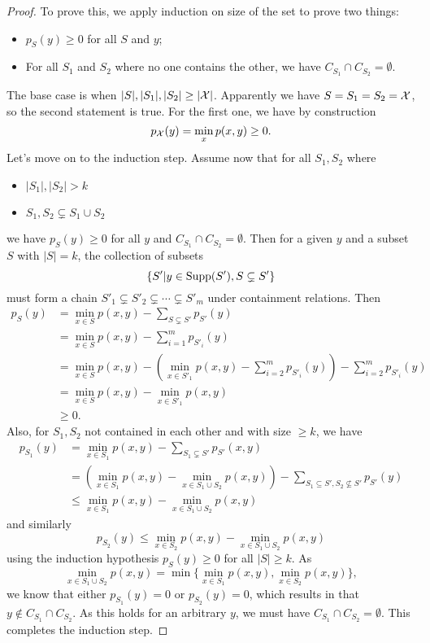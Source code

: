 \begin{proof}
    To prove this, we apply induction on size of the set to prove two things: 
    \begin{itemize}
    \item $p_S(y)\geq 0$ for all $S$ and $y$;
    \item For all $S_1$ and $S_2$ where no one contains the other, we have $C_{S_1}\cap C_{S_2}=\emptyset$.
    \end{itemize}
    The base case is when $|S|,|S_1|,|S_2|\geq|\mathcal{X}|$. Apparently we have $S=S_1=S_2=\mathcal{X}$, so the second statement is true. For the first one, we have by construction
    $$p_{\mathcal{X}}(y)=\min_xp(x,y)\geq0.$$
    Let's move on to the induction step. Assume now that for all $S_1,S_2$ where\begin{itemize}\item $|S_1|,|S_2|> k$\item $S_1,S_2\subsetneq S_1\cup S_2$\end{itemize}
    we have $p_S(y)\geq 0$ for all $y$ and $C_{S_1}\cap C_{S_2}=\emptyset$. Then for a given $y$ and a subset $S$ with $|S|=k$, the collection of subsets
    $$\{S'|y\in \mathrm{Supp}(S'),S\subsetneq S'\}$$
    must form a chain $S'_1\subsetneq S'_2\subsetneq \cdots\subsetneq S'_m$ under containment relations. Then
    \begin{align*}
        p_S(y)&=\min_{x\in S}p(x,y)-\sum_{S\subsetneq S'}p_{S'}(y)\\
        &=\min_{x\in S}p(x,y)-\sum_{i=1}^m p_{S'_i}(y)\\
        &=\min_{x\in S}p(x,y)-\left(\min_{x\in S'_1}p(x,y)-\sum_{i=2}^m p_{S'_i}(y)\right)-\sum_{i=2}^m p_{S'_i}(y)\\
        &=\min_{x\in S}p(x,y)-\min_{x\in S'_1}p(x,y)\\
        &\geq0.
    \end{align*}
    Also, for $S_1,S_2$ not contained in each other and with size $\geq k$, we have
    \begin{align*}
        p_{S_1}(y)&=\min_{x\in S_1}p(x,y)-\sum_{S_1\subsetneq S'}p_{S'}(x,y)\\
        &=\left(\min_{x\in S_1}p(x,y)-\min_{x\in S_1\cup S_2}p(x,y)\right)-\sum_{S_1\subseteq S', S_2\not\subseteq S'}p_{S'}(y)\\
        &\leq \min_{x\in S_1}p(x,y)-\min_{x\in S_1\cup S_2}p(x,y)\end{align*}
     and similarly 
     $$p_{S_2}(y)\leq\min_{x\in S_2}p(x,y)-\min_{x\in S_1\cup S_2}p(x,y)$$
     using the induction hypothesis $p_S(y)\geq0$ for all $|S|\geq k$.
    As $$\min_{x\in S_1\cup S_2}p(x,y)=\min\{\min_{x\in S_1}p(x,y),\min_{x\in S_2}p(x,y)\},$$ we know that either $p_{S_1}(y)= 0$ or $p_{S_2}(y)= 0$, which results in that $y\notin C_{S_1}\cap C_{S_2}$. As this holds for an arbitrary $y$, we must have $C_{S_1}\cap C_{S_2}=\emptyset$. This completes the induction step.
    

\end{proof}
